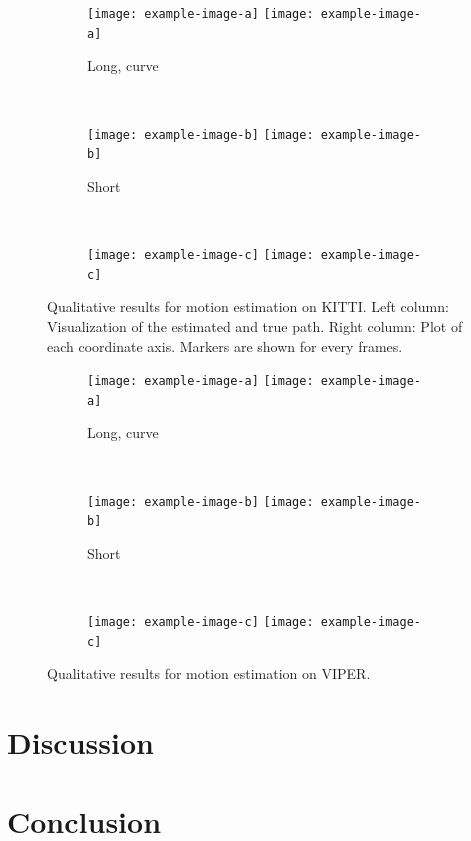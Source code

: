 		\begin{figure}
			\centering
			\begin{subfigure}[b]{\linewidth}
				\centering
				\texttt{[image: example-image-a]}
				\texttt{[image: example-image-a]}
				\caption{
					Long, curve
					\label{fig:0}
				}
			\end{subfigure}%
			\\
			\begin{subfigure}[b]{\linewidth}
				\centering
				\texttt{[image: example-image-b]}
				\texttt{[image: example-image-b]}
				\caption{
					Short
					\label{fig:0}
				}
			\end{subfigure}%
			\\
			\begin{subfigure}[b]{\linewidth}
				\centering
				\texttt{[image: example-image-c]}
				\texttt{[image: example-image-c]}
				\caption{
					\label{fig:0}
				}
			\end{subfigure}%
			\caption[Qualitative results for motion estimation on KITTI]
					{Qualitative results for motion estimation on KITTI.
					 Left column: Visualization of the estimated and true path.
					 Right column: Plot of each coordinate axis.
					 Markers are shown for every  frames.
					\label{fig:0}}
		\end{figure}
	
	
		\begin{figure}
			\centering
			\begin{subfigure}[b]{\linewidth}
				\centering
				\texttt{[image: example-image-a]}
				\texttt{[image: example-image-a]}
				\caption{
					Long, curve
					\label{fig:0}
				}
			\end{subfigure}%
			\\
			\begin{subfigure}[b]{\linewidth}
				\centering
				\texttt{[image: example-image-b]}
				\texttt{[image: example-image-b]}
				\caption{
					Short
					\label{fig:0}
				}
			\end{subfigure}%
			\\
			\begin{subfigure}[b]{\linewidth}
				\centering
				\texttt{[image: example-image-c]}
				\texttt{[image: example-image-c]}
				\caption{
					\label{fig:0}
				}
			\end{subfigure}%
			\caption[Qualitative results for motion estimation on VIPER]
					{Qualitative results for motion estimation on VIPER.
					 \label{fig:0}}
		\end{figure}
		
	\section{Discussion}
	\section{Conclusion}
